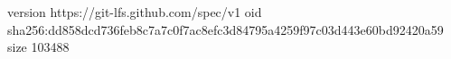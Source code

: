 version https://git-lfs.github.com/spec/v1
oid sha256:dd858dcd736feb8c7a7c0f7ac8efc3d84795a4259f97c03d443e60bd92420a59
size 103488
